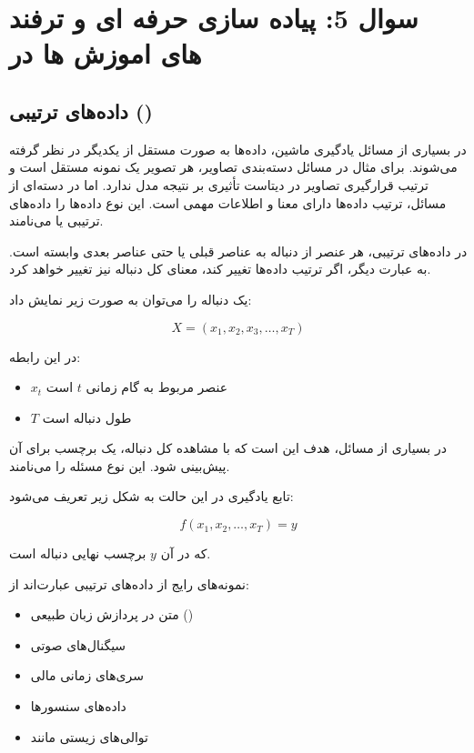\documentclass{article}
\begin{document}
\section {سوال 5: پیاده سازی حرفه ای و ترفند های اموزش  ها در }

\subsection{داده‌های ترتیبی ()}

در بسیاری از مسائل یادگیری ماشین، داده‌ها به صورت مستقل از یکدیگر در نظر گرفته می‌شوند. 
برای مثال در مسائل دسته‌بندی تصاویر، هر تصویر یک نمونه مستقل است و ترتیب قرارگیری تصاویر در دیتاست تأثیری بر نتیجه مدل ندارد. 
اما در دسته‌ای از مسائل، ترتیب داده‌ها دارای معنا و اطلاعات مهمی است. این نوع داده‌ها را داده‌های ترتیبی یا  می‌نامند.

در داده‌های ترتیبی، هر عنصر از دنباله به عناصر قبلی یا حتی عناصر بعدی وابسته است. به عبارت دیگر، اگر ترتیب داده‌ها تغییر کند، معنای کل دنباله نیز تغییر خواهد کرد.

یک دنباله را می‌توان به صورت زیر نمایش داد:

\begin{equation}
	X = (x_1, x_2, x_3, \dots, x_T)
\end{equation}

در این رابطه:
\begin{itemize}
	\item \(x_t\) عنصر مربوط به گام زمانی \(t\) است
	\item \(T\) طول دنباله است
\end{itemize}

در بسیاری از مسائل، هدف این است که با مشاهده کل دنباله، یک برچسب برای آن پیش‌بینی شود. 
این نوع مسئله را  می‌نامند.

تابع یادگیری در این حالت به شکل زیر تعریف می‌شود:

\begin{equation}
	f(x_1, x_2, \dots, x_T) = y
\end{equation}

که در آن \(y\) برچسب نهایی دنباله است.

نمونه‌های رایج از داده‌های ترتیبی عبارت‌اند از:

\begin{itemize}
	\item متن در پردازش زبان طبیعی ()
	\item سیگنال‌های صوتی
	\item سری‌های زمانی مالی
	\item داده‌های سنسورها
	\item توالی‌های زیستی مانند 
\end{itemize}
\end{document}

